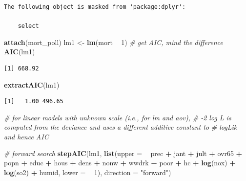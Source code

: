 \documentclass[
]{book}
\newenvironment{Shaded}{\begin{snugshade}}{\end{snugshade}}
\newcommand{\CommentTok}[1]{\textcolor[rgb]{0.56,0.35,0.01}{\textit{#1}}}
\newcommand{\DataTypeTok}[1]{\textcolor[rgb]{0.13,0.29,0.53}{#1}}
\newcommand{\DecValTok}[1]{\textcolor[rgb]{0.00,0.00,0.81}{#1}}
\newcommand{\KeywordTok}[1]{\textcolor[rgb]{0.13,0.29,0.53}{\textbf{#1}}}
\newcommand{\NormalTok}[1]{#1}
\newcommand{\OperatorTok}[1]{\textcolor[rgb]{0.81,0.36,0.00}{\textbf{#1}}}
\newcommand{\StringTok}[1]{\textcolor[rgb]{0.31,0.60,0.02}{#1}}
\begin{document}
\begin{verbatim}
The following object is masked from 'package:dplyr':

    select
\end{verbatim}

\begin{Shaded}
\begin{Highlighting}[]
\KeywordTok{attach}\NormalTok{(mort_poll)}
\NormalTok{lm1 <-}\StringTok{ }\KeywordTok{lm}\NormalTok{(mort }\OperatorTok{~}\StringTok{ }\DecValTok{1}\NormalTok{)}
\CommentTok{# get AIC, mind the difference}
\KeywordTok{AIC}\NormalTok{(lm1)}
\end{Highlighting}
\end{Shaded}

\begin{verbatim}
[1] 668.92
\end{verbatim}

\begin{Shaded}
\begin{Highlighting}[]
\KeywordTok{extractAIC}\NormalTok{(lm1)}
\end{Highlighting}
\end{Shaded}

\begin{verbatim}
[1]   1.00 496.65
\end{verbatim}

\begin{Shaded}
\begin{Highlighting}[]
\CommentTok{# for linear models with unknown scale (i.e., for lm and aov), }
\CommentTok{# -2 log L is computed from the deviance and uses a different additive constant to }
\CommentTok{# logLik and hence AIC }

\CommentTok{# forward search}
\KeywordTok{stepAIC}\NormalTok{(lm1, }\KeywordTok{list}\NormalTok{(}\DataTypeTok{upper =} \OperatorTok{~}\StringTok{ }\NormalTok{prec }\OperatorTok{+}\StringTok{ }\NormalTok{jant }\OperatorTok{+}\StringTok{ }\NormalTok{jult }\OperatorTok{+}\StringTok{ }\NormalTok{ovr65 }\OperatorTok{+}\StringTok{ }\NormalTok{popn }\OperatorTok{+}\StringTok{ }\NormalTok{educ }\OperatorTok{+}\StringTok{ }\NormalTok{hous }\OperatorTok{+}\StringTok{ }\NormalTok{dens }\OperatorTok{+}\StringTok{ }\NormalTok{nonw }\OperatorTok{+}\StringTok{ }\NormalTok{wwdrk }\OperatorTok{+}\StringTok{ }\NormalTok{poor }\OperatorTok{+}\StringTok{ }\NormalTok{hc }\OperatorTok{+}\StringTok{ }\KeywordTok{log}\NormalTok{(nox) }\OperatorTok{+}\StringTok{ }\KeywordTok{log}\NormalTok{(so2) }\OperatorTok{+}\StringTok{ }\NormalTok{humid, }\DataTypeTok{lower =} \OperatorTok{~}\StringTok{ }\DecValTok{1}\NormalTok{), }\DataTypeTok{direction =} \StringTok{"forward"}\NormalTok{)}
\end{Highlighting}
\end{Shaded}
\end{document}
